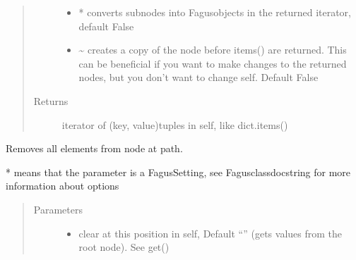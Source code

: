 \documentclass[a4paper,10pt,english]{sphinxmanual}
\begin{document}
\begin{fulllineitems}
\begin{fulllineitems}
\begin{quote}
\begin{description}
\begin{itemize}
\item {}
\sphinxAtStartPar
{} \textendash{} * converts sub\sphinxhyphen{}nodes into Fagus\sphinxhyphen{}objects in the returned iterator, default False

\item {}
\sphinxAtStartPar
{} \textendash{} \textasciitilde{} creates a copy of the node before items() are returned. This can be beneficial if you want to make
changes to the returned nodes, but you don’t want to change self. Default False

\end{itemize}

\item[{Returns}] \leavevmode
\sphinxAtStartPar
iterator of (key, value)\sphinxhyphen{}tuples in self, like dict.items()

\end{description}\end{quote}

\end{fulllineitems}


\begin{fulllineitems}
\label{\detokenize{fagus.fagus:fagus.fagus.Fagus.clear}}
\pysigstartsignatures
{}
\pysigstopsignatures
\sphinxAtStartPar
Removes all elements from node at path.

\sphinxAtStartPar
* means that the parameter is a Fagus\sphinxhyphen{}Setting, see Fagus\sphinxhyphen{}class\sphinxhyphen{}docstring for more information about options
\begin{quote}\begin{description}
\item[{Parameters}] \leavevmode\begin{itemize}
\item {}
\sphinxAtStartPar
{} \textendash{} clear at this position in self, Default “” (gets values from the root node). See get()


\end{itemize}
\end{description}
\end{quote}
\end{fulllineitems}
\end{fulllineitems}
\end{document}
